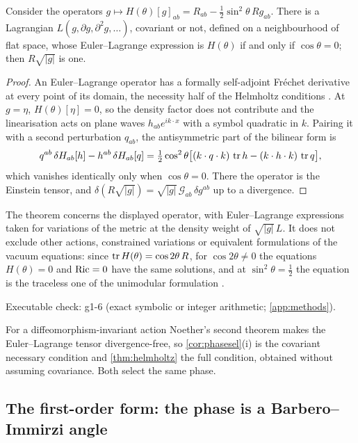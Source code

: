 \begin{theorem}
\label{thm:helmholtz}
Consider the operators $g\mapsto H(\theta)[g]_{ab}=R_{ab}-\tfrac12\sin^2\theta\,Rg_{ab}$. There is a Lagrangian $L(g,\partial g,\partial^2g,\dots)$, covariant or not, defined
on a neighbourhood of flat space, whose Euler--Lagrange expression is $H(\theta)$ if and only if $\cos\theta=0$; then $R\sqrt{|g|}$ is one.
\end{theorem}

\begin{proof}
An Euler--Lagrange operator has a formally self-adjoint Fr\'echet derivative at every point of its domain, the necessity half of the Helmholtz conditions
\cite{Vainberg64,Olver93}. At $g=\eta$, $H(\theta)[\eta]=0$, so the density factor does not contribute and the linearisation acts on plane waves $h_{ab}e^{ik\cdot x}$ with a
symbol quadratic in $k$. Pairing it with a second perturbation $q_{ab}$, the antisymmetric part of the bilinear form is
\[
q^{ab}\,\delta H_{ab}[h]-h^{ab}\,\delta H_{ab}[q]=\tfrac12\cos^2\theta\bigl[(k\cdot q\cdot k)\,\operatorname{tr} h-(k\cdot h\cdot k)\,\operatorname{tr} q\bigr],
\]
which vanishes identically only when $\cos\theta=0$. There the operator is the Einstein tensor, and $\delta(R\sqrt{|g|})=\sqrt{|g|}\,\mathcal G_{ab}\,\delta g^{ab}$ up to a
divergence.
\end{proof}

The theorem concerns the displayed operator, with Euler--Lagrange expressions taken for variations of the metric at the density weight of
$\sqrt{|g|}\,L$. It does not exclude other actions, constrained variations or equivalent formulations of the vacuum equations: since
$\operatorname{tr} H(\theta)=\cos2\theta\,R$, for $\cos2\theta\neq0$ the equations $H(\theta)=0$ and $\operatorname{Ric}=0$ have the same solutions, and at $\sin^2\theta=\tfrac12$ the equation is
the traceless one of the unimodular formulation \cite{HenneauxTeitelboim89}.

\noindent Executable check: g1-6 (exact symbolic or integer arithmetic; \cref{app:methods}).

For a diffeomorphism-invariant action Noether's second theorem makes the Euler--Lagrange tensor divergence-free, so \cref{cor:phasesel}(i) is the covariant
necessary condition and \cref{thm:helmholtz} the full condition, obtained without assuming covariance. Both select the same phase.

\subsection{The first-order form: the phase is a Barbero--Immirzi angle}

